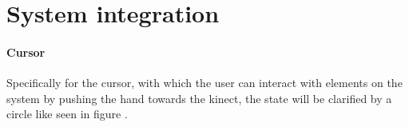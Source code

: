 \chapter{System integration}

\subsubsection{Cursor}
Specifically for the cursor, with which the user can interact with elements on the system by pushing the hand towards the kinect, the state will be clarified by a circle like seen in figure .